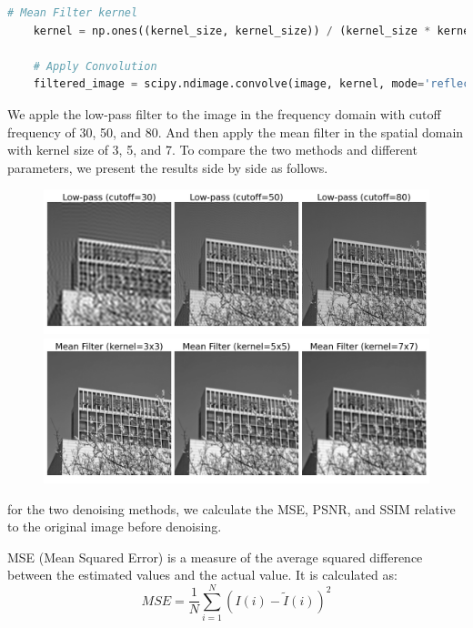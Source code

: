 \documentclass[12pt, a4paper, oneside]{ctexart}
\begin{document}
\begin{lstlisting}[style=mystyle,language=Python]
	# Mean Filter kernel
	kernel = np.ones((kernel_size, kernel_size)) / (kernel_size * kernel_size)
		
	# Apply Convolution
	filtered_image = scipy.ndimage.convolve(image, kernel, mode='reflect')

\end{lstlisting}

We apple the low-pass filter to the image in the frequency domain with cutoff frequency of 30, 50, and 80. And then apply the mean filter in the spatial domain with kernel size of 3, 5, and 7. To compare the two methods and different parameters, we present the results side by side as follows.



\begin{figure}[h]
	\centering
	\includegraphics[width=1\textwidth]{./result/frequency_domain_results.png}
	\includegraphics[width=1\textwidth]{./result/spatial_domain_results.png}
\end{figure}




for the two denoising methods, we calculate the MSE, PSNR, and SSIM relative to the original image before denoising. 

MSE (Mean Squared Error) is a measure of the average squared difference between the estimated values and the actual value. It is calculated as:
\[
MSE = \frac{1}{N}\sum_{i=1}^{N} (I(i) - \tilde{I}(i))^2
\]
\end{document}
